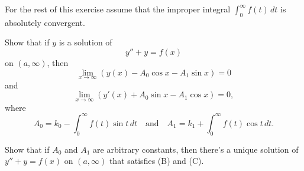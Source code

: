 \begin{exerciselist}
For the rest of this exercise assume that the improper
integral
$\int_{0}^\infty f(t)\,dt$ is absolutely convergent.

\begin{alist}[resume]
\item %
Show that if $y$ is a solution of
\[
y''+y=f(x)
\tag{A}
\]
 on $(a,\infty)$, then
 \[
\lim_{x \to \infty}\left(y(x)-A_0\cos x-A_1\sin x\right)=0
\tag{B}
\]
and
\[
\lim_{x\to\infty}\left(y'(x)+A_0\sin x-A_1\cos x\right)=0,
\tag{C}
\]
where
\[
A_0=k_0-\int_0^\infty f(t)\sin t\,dt\quad\text{and}\quad 
A_1=k_1+\int_0^\infty f(t)\cos t\,dt.
\]

\item %
Show that if $A_0$ and $A_1$ are arbitrary constants, then there's a
unique solution of $y''+y=f(x)$ on $(a,\infty)$ that satisfies
(B)  and (C).
\end{alist}

\end{exerciselist}
